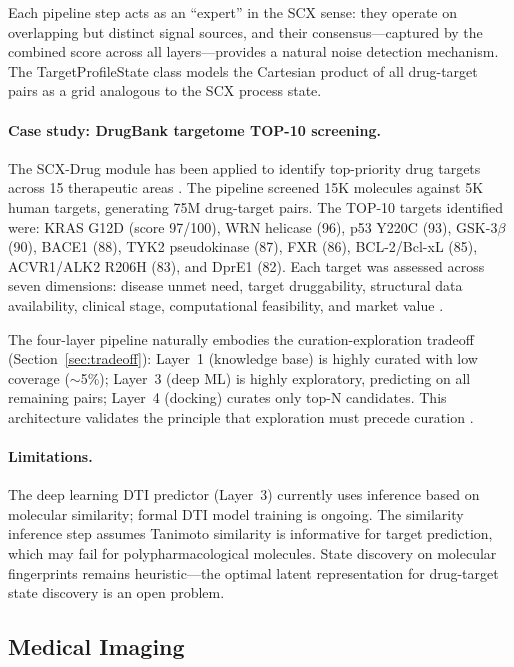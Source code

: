 \documentclass[twocolumn]{article}
\theoremstyle{definition}
\begin{document}
Each pipeline step acts as an ``expert'' in the SCX sense: they operate on overlapping but distinct signal sources, and their consensus---captured by the combined score across all layers---provides a natural noise detection mechanism. The TargetProfileState class \cite{drug_state} models the Cartesian product of all drug-target pairs as a grid analogous to the SCX process state.

\paragraph{Case study: DrugBank targetome TOP-10 screening.}
The SCX-Drug module has been applied to identify top-priority drug targets across 15 therapeutic areas \cite{targetome_top10}. The pipeline screened 15K molecules against 5K human targets, generating 75M drug-target pairs. The TOP-10 targets identified were: KRAS G12D (score 97/100), WRN helicase (96), p53 Y220C (93), GSK-3$\beta$ (90), BACE1 (88), TYK2 pseudokinase (87), FXR (86), BCL-2/Bcl-xL (85), ACVR1/ALK2 R206H (83), and DprE1 (82). Each target was assessed across seven dimensions: disease unmet need, target druggability, structural data availability, clinical stage, computational feasibility, and market value \cite{targetome_top10}.

The four-layer pipeline naturally embodies the curation-exploration tradeoff (Section~\ref{sec:tradeoff}): Layer~1 (knowledge base) is highly curated with low coverage ($\sim$5\%); Layer~3 (deep ML) is highly exploratory, predicting on all remaining pairs; Layer~4 (docking) curates only top-N candidates. This architecture validates the principle that exploration must precede curation \cite{paperII}.

\paragraph{Limitations.}
The deep learning DTI predictor (Layer~3) currently uses inference based on molecular similarity; formal DTI model training is ongoing. The similarity inference step assumes Tanimoto similarity is informative for target prediction, which may fail for polypharmacological molecules. State discovery on molecular fingerprints remains heuristic---the optimal latent representation for drug-target state discovery is an open problem.

\subsection{Medical Imaging}
\end{document}
